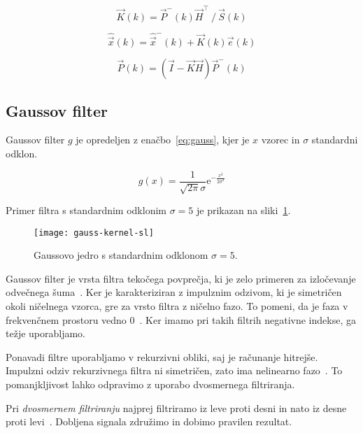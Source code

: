\begin{equation}
\vec{K}(k) = {\vec{P}^-(k) \vec{H}^\top} ~/~ {\vec{S}(k)}
\label{eq:ojacanje}
\end{equation}

\begin{equation}
\hat{\vec{x}}(k) = \hat{\vec{x}}^-(k) + \vec{K}(k) \vec{e}(k)
\label{eq:aposteriori-stanje}
\end{equation}

\begin{equation}
\vec{P}(k) = \left( \vec{I} - \vec{K} \vec{H} \right) \vec{P}^-(k)
\label{eq:aposteriori-p}
\end{equation}








\subsection{Gaussov filter}\label{sec:gaussov-filter}
Gaussov filter $g$ je opredeljen z enačbo~\eqref{eq:gauss}, kjer je $x$ vzorec in $\sigma$ standardni odklon. 


\begin{equation}
g(x) = \frac{1}{\sqrt{2 \pi} \sigma} \mathrm{e}^{-\frac{x^2}{2 \sigma^2}} 
\label{eq:gauss}
\end{equation}


Primer filtra s standardnim odklonim $\sigma = 5$ je prikazan na sliki~\ref{fig:gauss}.

\begin{figure}[!htb]
\centering
\texttt{[image: gauss-kernel-sl]}
\caption[Gaussovo jedro s standardnim odklonom $\sigma=5$]{Gaussovo jedro s standardnim odklonom $\sigma=5$. }
\label{fig:gauss}
\end{figure}


Gaussov filter je vrsta filtra tekočega povprečja, ki je zelo primeren za izločevanje odvečnega šuma~\cite{smith1997scientist}. Ker je karakteriziran z impulznim odzivom, ki je simetričen okoli ničelnega vzorca, gre za vrsto filtra z ničelno fazo. To pomeni, da je faza v frekvenčnem prostoru vedno $0$~\cite{smith1997scientist}. Ker imamo pri takih filtrih negativne indekse, ga težje uporabljamo. 

Ponavadi filtre uporabljamo v rekurzivni obliki, saj je računanje hitrejše. Impulzni odziv rekurzivnega filtra ni simetričen, zato ima nelinearno fazo~\cite{smith1997scientist}. To pomanjkljivost lahko odpravimo z uporabo dvosmernega filtriranja.

Pri \emph{dvosmernem filtriranju} najprej filtriramo iz leve proti desni in nato iz desne proti levi~\cite{smith1997scientist}. Dobljena signala združimo in dobimo pravilen rezultat.


